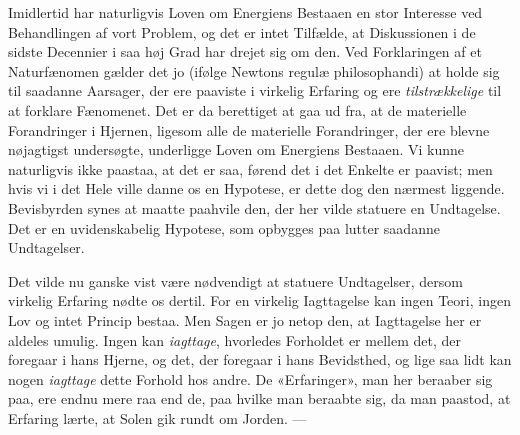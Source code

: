 \documentclass[12pt,a4paper,openany]{book}
\newcommand{\opage}[1]{\marginnote{\footnotesize\textit{[#1]}}}
\begin{document}
Imidlertid har naturligvis Loven om Energiens Bestaaen en stor Interesse ved
Behandlingen af vort Problem, og det er intet Tilfælde, at Diskussionen i de
sidste Decennier i saa høj Grad har drejet sig om den. Ved Forklaringen af et
Naturfænomen gælder det jo (ifølge Newtons regulæ philosophandi) at holde sig
til saadanne Aarsager, der ere paaviste i virkelig Erfaring og ere
\emph{tilstrækkelige} til at forklare Fænomenet. Det er da berettiget at gaa ud
fra, at de materielle Forandringer i Hjernen, ligesom alle de materielle
Forandringer, der ere blevne nøjagtigst undersøgte, underligge Loven om
Energiens Bestaaen. Vi kunne naturligvis ikke paastaa, at det er saa, førend
det i det Enkelte er paavist; men hvis vi i det Hele ville danne os en
Hypotese, er dette dog den nærmest liggende. Bevisbyrden synes at maatte
paahvile den, der her vilde statuere en Undtagelse. Det er en uvidenskabelig
Hypotese, som opbygges paa lutter saadanne Undtagelser.

Det vilde nu ganske vist være nødvendigt at statuere Undtagelser, dersom
virkelig Erfaring nødte os dertil. For en virkelig Iagttagelse kan ingen Teori,
ingen Lov og intet Princip bestaa. Men Sagen er jo netop den, at Iagttagelse
her er aldeles umulig. Ingen
\setcounter{footnote}{0}%
\opage{85}kan \emph{iagttage}, hvorledes Forholdet er mellem det, der foregaar
i hans Hjerne, og det, der foregaar i hans Bevidsthed, og lige saa lidt kan
nogen \emph{iagttage} dette Forhold hos andre. De «Erfaringer», man her
beraaber sig paa, ere endnu mere raa end de, paa hvilke man beraabte sig, da
man paastod, at Erfaring lærte, at Solen gik rundt om Jorden. ---
\end{document}
